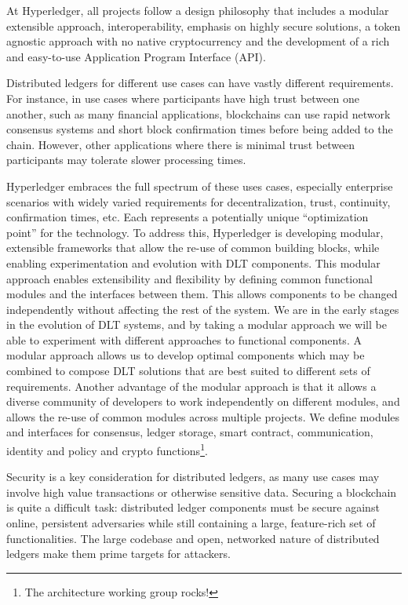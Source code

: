 At Hyperledger, all projects follow a design philosophy that includes a modular extensible approach, interoperability, emphasis on highly secure solutions, a token agnostic approach with no native cryptocurrency and the development of a rich and easy-to-use Application Program Interface (API).

Distributed ledgers for different use cases can have vastly different requirements. For instance, in use cases where participants have high trust between one another, such as many financial applications, blockchains can use rapid network consensus systems and short block confirmation times before being added to the chain. However, other applications where there is minimal trust between participants may tolerate slower processing times.

Hyperledger embraces the full spectrum of these uses cases, especially enterprise scenarios with widely varied requirements for decentralization, trust, continuity, confirmation times, etc. Each represents a potentially unique “optimization point” for the technology. To address this, Hyperledger is developing modular, extensible frameworks that allow the re-use of common building blocks, while enabling experimentation and evolution with DLT components. This modular approach enables extensibility and flexibility by defining common functional modules and the interfaces between them. This allows components to be changed independently without affecting the rest of the system. We are in the early stages in the evolution of DLT systems, and by taking a modular approach we will be able to experiment with different approaches to functional components. A modular approach allows us to develop optimal components which may be combined to compose DLT solutions that are best suited to different sets of requirements. Another advantage of the modular approach is that it allows a diverse community of developers to work independently on different modules, and allows the re-use of common modules across multiple projects. We define modules and interfaces for consensus, ledger storage, smart contract, communication, identity and policy and crypto functions\footnote{The architecture working group rocks!}. 

Security is a key consideration for distributed ledgers, as many use cases may involve high value transactions or otherwise sensitive data.  Securing a blockchain is quite a difficult task:  distributed ledger components must be secure against online, persistent adversaries while still containing a large, feature-rich set of functionalities.  The large codebase and open, networked nature of distributed ledgers make them prime targets for attackers.  

